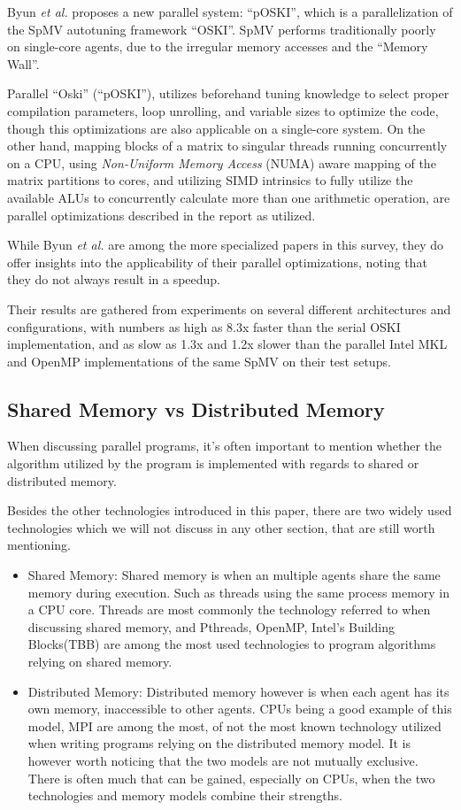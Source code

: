 Byun \textit{et al.}\cite{Byun:EECS-2012-215} proposes a new parallel system: ``pOSKI'', which is a parallelization of the SpMV autotuning framework ``OSKI''.
SpMV performs traditionally poorly on single-core agents, due to the irregular memory accesses and the ``Memory Wall''.

Parallel ``Oski'' (``pOSKI''), utilizes beforehand tuning knowledge to select proper compilation parameters, loop unrolling, and variable sizes to optimize the code, though this optimizations are also applicable on a single-core system.
On the other hand, mapping blocks of a matrix to singular threads running concurrently on a CPU, using \textit{Non-Uniform Memory Access} (NUMA) aware mapping of the matrix partitions to cores, and utilizing SIMD intrinsics to fully utilize the available ALUs to concurrently calculate more than one arithmetic operation, are parallel optimizations described in the report as utilized.

While Byun \textit{et al.}\cite{Byun:EECS-2012-215} are among the more specialized papers in this survey, they do offer insights into the applicability of their parallel optimizations, noting that they do not always result in a speedup.

Their results are gathered from experiments on several different architectures and configurations, with numbers as high as 8.3x faster than the serial OSKI implementation, and as slow as 1.3x and 1.2x slower than the parallel Intel MKL and OpenMP implementations of the same SpMV on their test setups.

\subsection{Shared Memory vs Distributed Memory}

When discussing parallel programs, it's often important to mention whether the algorithm utilized by the program is implemented with regards to shared or distributed memory.

Besides the other technologies introduced in this paper, there are two widely used technologies which we will not discuss in any other section, that are still worth mentioning.

\begin{itemize}
	\item{Shared Memory:}
	Shared memory is when an multiple agents share the same memory during execution. Such as threads using the same process memory in a CPU core.
	Threads are most commonly the technology referred to when discussing shared memory, and Pthreads, OpenMP, Intel's Building Blocks\texttrademark (TBB) are among the most used technologies to program algorithms relying on shared memory.
	\item{Distributed Memory:}
		Distributed memory however is when each agent has its own memory, inaccessible to other agents.
		CPUs being a good example of this model, MPI are among the most, of not the most known technology utilized when writing programs relying on the distributed memory model.
		It is however worth noticing that the two models are not mutually exclusive.
		There is often much that can be gained, especially on CPUs, when the two technologies and memory models combine their strengths.
\end{itemize}
